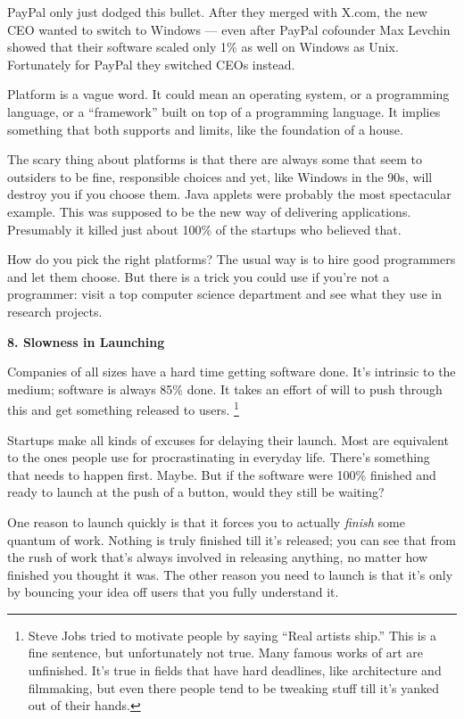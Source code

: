 PayPal only just dodged this bullet. After they merged with X.com, the
new CEO wanted to switch to Windows --- even after PayPal cofounder Max
Levchin showed that their software scaled only 1\% as well on Windows as
Unix. Fortunately for PayPal they switched CEOs instead.

Platform is a vague word. It could mean an operating system, or a
programming language, or a ``framework'' built on top of a programming
language. It implies something that both supports and limits, like the
foundation of a house.

The scary thing about platforms is that there are always some that seem
to outsiders to be fine, responsible choices and yet, like Windows in
the 90s, will destroy you if you choose them. Java applets were probably
the most spectacular example. This was supposed to be the new way of
delivering applications. Presumably it killed just about 100\% of the
startups who believed that.

How do you pick the right platforms? The usual way is to hire good
programmers and let them choose. But there is a trick you could use if
you're not a programmer: visit a top computer science department and see
what they use in research projects.

\textbf{8. Slowness in Launching}

Companies of all sizes have a hard time getting software done. It's
intrinsic to the medium; software is always 85\% done. It takes an
effort of will to push through this and get something released to users.
\footnote{Steve Jobs tried to motivate people by saying ``Real artists
ship.'' This is a fine sentence, but unfortunately not true. Many famous
works of art are unfinished. It's true in fields that have hard
deadlines, like architecture and filmmaking, but even there people tend
to be tweaking stuff till it's yanked out of their hands.}

Startups make all kinds of excuses for delaying their launch. Most are
equivalent to the ones people use for procrastinating in everyday life.
There's something that needs to happen first. Maybe. But if the software
were 100\% finished and ready to launch at the push of a button, would
they still be waiting?

One reason to launch quickly is that it forces you to actually
\emph{finish} some quantum of work. Nothing is truly finished till it's
released; you can see that from the rush of work that's always involved
in releasing anything, no matter how finished you thought it was. The
other reason you need to launch is that it's only by bouncing your idea
off users that you fully understand it.


